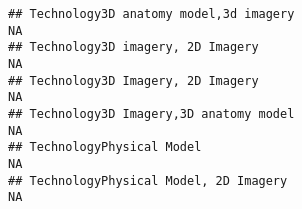 \documentclass[]{article}
\begin{document}
\begin{verbatim}
## Technology3D anatomy model,3d imagery                                                                                                                                                                                                                                                                                                                                                                                                                                                 NA
## Technology3D imagery, 2D Imagery                                                                                                                                                                                                                                                                                                                                                                                                                                                      NA
## Technology3D Imagery, 2D Imagery                                                                                                                                                                                                                                                                                                                                                                                                                                                      NA
## Technology3D Imagery,3D anatomy model                                                                                                                                                                                                                                                                                                                                                                                                                                                 NA
## TechnologyPhysical Model                                                                                                                                                                                                                                                                                                                                                                                                                                                              NA
## TechnologyPhysical Model, 2D Imagery                                                                                                                                                                                                                                                                                                                                                                                                                                                  NA

\end{verbatim}
\end{document}
